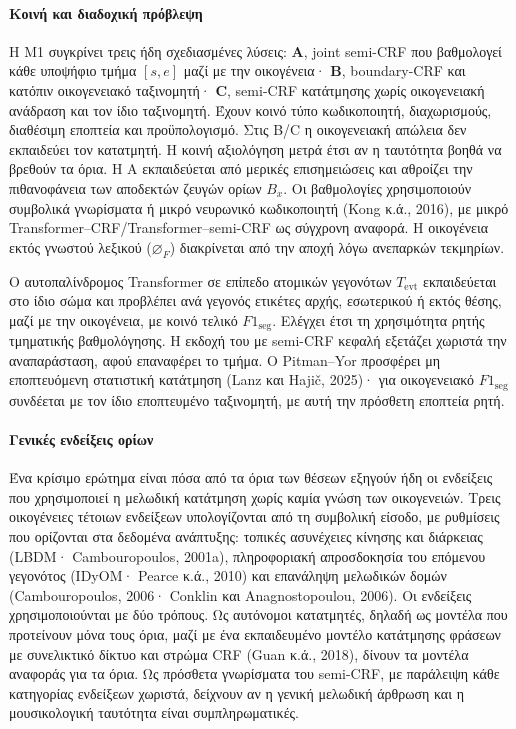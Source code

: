 \documentclass[a4paper]{article}
\begin{document}
\paragraph{Κοινή και διαδοχική πρόβλεψη}
Η Μ1 συγκρίνει τρεις ήδη σχεδιασμένες λύσεις: \textbf{A}, joint semi-CRF που βαθμολογεί κάθε υποψήφιο τμήμα $[s,e]$ μαζί με την οικογένεια· \textbf{B}, boundary-CRF και κατόπιν οικογενειακό ταξινομητή· \textbf{C}, semi-CRF κατάτμησης χωρίς οικογενειακή ανάδραση και τον ίδιο ταξινομητή. Έχουν κοινό τύπο κωδικοποιητή, διαχωρισμούς, διαθέσιμη εποπτεία και προϋπολογισμό. Στις B/C η οικογενειακή απώλεια δεν εκπαιδεύει τον κατατμητή. Η κοινή αξιολόγηση μετρά έτσι αν η ταυτότητα βοηθά να βρεθούν τα όρια. Η A εκπαιδεύεται από μερικές επισημειώσεις και αθροίζει την πιθανοφάνεια των αποδεκτών ζευγών ορίων $B_x$. Οι βαθμολογίες χρησιμοποιούν συμβολικά γνωρίσματα ή μικρό νευρωνικό κωδικοποιητή (Kong κ.ά., 2016), με μικρό Transformer--CRF/Transformer--semi-CRF ως σύγχρονη αναφορά. Η οικογένεια εκτός γνωστού λεξικού ($\varnothing_F$) διακρίνεται από την αποχή λόγω ανεπαρκών τεκμηρίων.

Ο αυτοπαλίνδρομος Transformer σε επίπεδο ατομικών γεγονότων $T_{\mathrm{evt}}$ εκπαιδεύεται στο ίδιο σώμα και προβλέπει ανά γεγονός ετικέτες αρχής, εσωτερικού ή εκτός θέσης, μαζί με την οικογένεια, με κοινό τελικό $F1_{\mathrm{seg}}$. Ελέγχει έτσι τη χρησιμότητα ρητής τμηματικής βαθμολόγησης. Η εκδοχή του με semi-CRF κεφαλή εξετάζει χωριστά την αναπαράσταση, αφού επαναφέρει το τμήμα. Ο Pitman--Yor προσφέρει μη εποπτευόμενη στατιστική κατάτμηση (Lanz και Hajič, 2025)· για οικογενειακό $F1_{\mathrm{seg}}$ συνδέεται με τον ίδιο εποπτευμένο ταξινομητή, με αυτή την πρόσθετη εποπτεία ρητή.

\paragraph{Γενικές ενδείξεις ορίων}
Ένα κρίσιμο ερώτημα είναι πόσα από τα όρια των θέσεων εξηγούν ήδη οι ενδείξεις που χρησιμοποιεί η μελωδική κατάτμηση χωρίς καμία γνώση των οικογενειών. Τρεις οικογένειες τέτοιων ενδείξεων υπολογίζονται από τη συμβολική είσοδο, με ρυθμίσεις που ορίζονται στα δεδομένα ανάπτυξης: τοπικές ασυνέχειες κίνησης και διάρκειας (LBDM· Cambouropoulos, 2001a), πληροφοριακή απροσδοκησία του επόμενου γεγονότος (IDyOM· Pearce κ.ά., 2010) και επανάληψη μελωδικών δομών (Cambouropoulos, 2006· Conklin και Anagnostopoulou, 2006). Οι ενδείξεις χρησιμοποιούνται με δύο τρόπους. Ως αυτόνομοι κατατμητές, δηλαδή ως μοντέλα που προτείνουν μόνα τους όρια, μαζί με ένα εκπαιδευμένο μοντέλο κατάτμησης φράσεων με συνελικτικό δίκτυο και στρώμα CRF (Guan κ.ά., 2018), δίνουν τα μοντέλα αναφοράς για τα όρια. Ως πρόσθετα γνωρίσματα του semi-CRF, με παράλειψη κάθε κατηγορίας ενδείξεων χωριστά, δείχνουν αν η γενική μελωδική άρθρωση και η μουσικολογική ταυτότητα είναι συμπληρωματικές.
\end{document}
